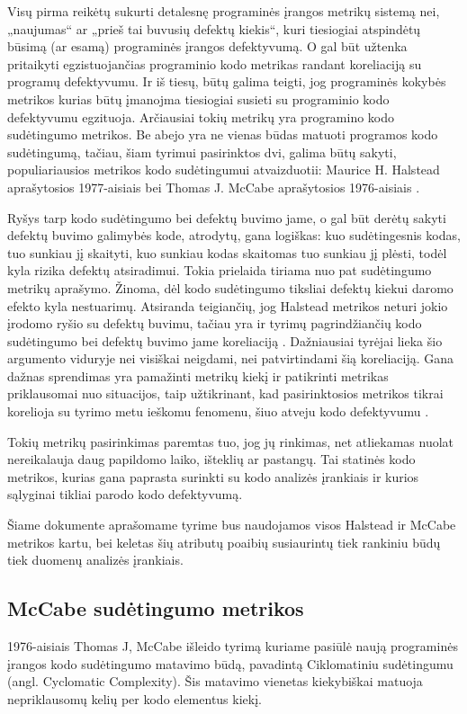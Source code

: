 \documentclass{VUMIFPSbakalaurinis}
\begin{document}
Visų pirma reikėtų sukurti detalesnę programinės įrangos metrikų sistemą nei, „naujumas“ ar „prieš tai buvusių defektų kiekis“, kuri tiesiogiai atspindėtų būsimą (ar esamą) programinės įrangos defektyvumą. O gal būt užtenka pritaikyti egzistuojančias programinio kodo metrikas randant koreliaciją su programų defektyvumu. Ir iš tiesų, būtų galima teigti, jog programinės kokybės metrikos kurias būtų įmanojma tiesiogiai susieti su programinio kodo defektyvumu egzituoja. Arčiausiai tokių metrikų yra programino kodo sudėtingumo metrikos. Be abejo yra ne vienas būdas matuoti programos kodo sudėtingumą, tačiau, šiam tyrimui pasirinktos dvi, galima būtų sakyti, populiariausios metrikos kodo sudėtingumui atvaizduotii: Maurice H. Halstead aprašytosios 1977-aisiais \cite{Halstead:1977:ESS:540137} bei Thomas J. McCabe aprašytosios 1976-aisiais \cite{McCabe:1976:CM:800253.807712}. 

Ryšys tarp kodo sudėtingumo bei defektų buvimo jame, o gal būt derėtų sakyti defektų buvimo galimybės kode, atrodytų, gana logiškas: kuo sudėtingesnis kodas, tuo sunkiau jį skaityti, kuo sunkiau kodas skaitomas tuo sunkiau jį plėsti, todėl kyla rizika defektų atsiradimui. Tokia prielaida tiriama nuo pat sudėtingumo metrikų aprašymo. Žinoma, dėl kodo sudėtingumo tiksliai defektų kiekui daromo efekto kyla nestuarimų. Atsiranda teigiančių, jog Halstead metrikos neturi jokio įrodomo ryšio su defektų buvimu, tačiau yra ir tyrimų pagrindžiančių kodo sudėtingumo bei defektų buvimo jame koreliaciją \cite{Schroeder1999APG}. Dažniausiai tyrėjai lieka šio argumento viduryje nei visiškai neigdami, nei patvirtindami šią koreliaciją. Gana dažnas sprendimas yra pamažinti metrikų kiekį ir patikrinti metrikas priklausomai nuo situacijos, taip užtikrinant, kad pasirinktosios metrikos tikrai korelioja su tyrimo metu ieškomu fenomenu, šiuo atveju kodo defektyvumu \cite{Metrics in Evaluating Software Defects:2013}.

Tokių metrikų pasirinkimas paremtas tuo, jog jų rinkimas, net atliekamas nuolat nereikalauja daug papildomo laiko, išteklių ar pastangų. Tai statinės kodo metrikos, kurias gana paprasta surinkti su kodo analizės įrankiais ir kurios sąlyginai tikliai parodo kodo defektyvumą.

Šiame dokumente aprašomame tyrime bus naudojamos visos Halstead ir McCabe metrikos kartu, bei keletas šių atributų poaibių susiaurintų tiek rankiniu būdų tiek duomenų analizės įrankiais.

\subsection{McCabe sudėtingumo metrikos}
1976-aisiais Thomas J, McCabe išleido tyrimą kuriame pasiūlė naują programinės įrangos kodo sudėtingumo matavimo būdą, pavadintą Ciklomatiniu sudėtingumu (angl. Cyclomatic Complexity). Šis matavimo vienetas kiekybiškai matuoja nepriklausomų kelių per kodo elementus kiekį.
\end{document}
